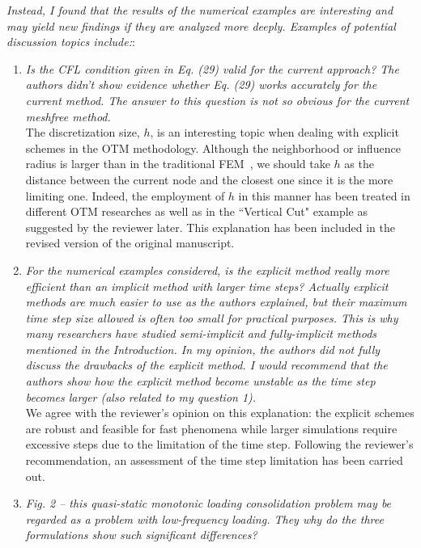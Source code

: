 \documentclass[12pt]{article}
\begin{document}
\textit{Instead, I found that the results of the numerical examples are interesting and may yield new findings if they are analyzed more deeply. Examples of potential discussion topics include:}:

\begin{enumerate}

\item \textit{Is the CFL condition given in Eq. (29) valid for the current approach? The authors didn't show evidence whether Eq. (29) works accurately for the current method. The answer to this question is not so obvious for the current meshfree method.}\\

The discretization size, $h$, is an interesting topic when dealing with explicit schemes in the OTM methodology. Although the neighborhood or influence radius is larger than in the traditional FEM~\cite{li2010}, we should take $h$ as the distance between the current node and the closest one since it is the more limiting one. Indeed, the employment of $h$ in this manner has been treated in different OTM researches as well as in the ``Vertical Cut" example as suggested by the reviewer later. This explanation has been included in the revised version of the original manuscript.


\item \textit{For the numerical examples considered, is the explicit method really more efficient than an implicit method with larger time steps? Actually explicit methods are much easier to use as the authors explained, but their maximum time step size allowed is often too small for practical purposes. This is why many researchers have studied semi-implicit and fully-implicit methods mentioned in the Introduction. In my opinion, the authors did not fully discuss the drawbacks of the explicit method. I would recommend that the authors show how the explicit method become unstable as the time step becomes larger (also related to my question 1).}\\

We agree with the reviewer's opinion on this explanation: the explicit schemes are robust and feasible for fast phenomena while larger simulations require excessive steps due to the limitation of the time step. Following the reviewer's recommendation, an assessment of the time step limitation has been carried out.


\item \textit{Fig. 2 -- this quasi-static monotonic loading consolidation problem may be regarded as a problem with low-frequency loading. They why do the three formulations show such significant differences?}\\


\end{enumerate}
\end{document}
